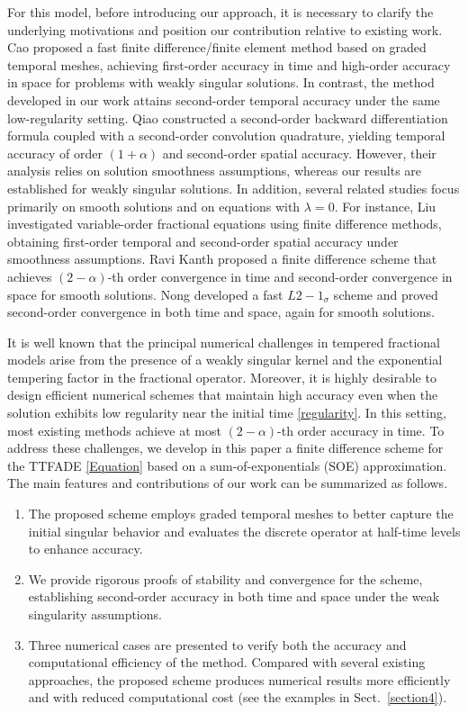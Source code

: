 \documentclass[10pt, reqno]{amsart}
\theoremstyle{remark}
\theoremstyle{definition}
\numberwithin{table}{section}
\begin{document}
For this model, before introducing our approach, it is necessary to clarify the underlying motivations and position our contribution relative to existing work. Cao \cite{cao2020} proposed a fast finite difference/finite element method based on graded temporal meshes, achieving first-order accuracy in time and high-order accuracy in space for problems with weakly singular solutions. In contrast, the method developed in our work attains second-order temporal accuracy under the same low-regularity setting. Qiao \cite{qiao2022} constructed a second-order backward differentiation formula coupled with a second-order convolution quadrature, yielding temporal accuracy of order $(1+\alpha)$ and second-order spatial accuracy. However, their analysis relies on solution smoothness assumptions, whereas our results are established for weakly singular solutions. In addition, several related studies focus primarily on smooth solutions and on equations with $\lambda = 0$. For instance, Liu \cite{Liu2018} investigated variable-order fractional equations using finite difference methods, obtaining first-order temporal and second-order spatial accuracy under smoothness assumptions. Ravi Kanth \cite{RaviKanth2018} proposed a finite difference scheme that achieves $(2-\alpha)$-th order convergence in time and second-order convergence in space for smooth solutions. Nong \cite{nong2024} developed a fast $L2-1_{\sigma}$ scheme and proved second-order convergence in both time and space, again for smooth solutions.

It is well known that the principal numerical challenges in tempered fractional models arise from the presence of a weakly singular kernel and the exponential tempering factor in the fractional operator. Moreover, it is highly desirable to design efficient numerical schemes that maintain high accuracy even when the solution exhibits low regularity near the initial time \eqref{regularity}. In this setting, most existing methods achieve at most $(2-\alpha)$-th order accuracy in time. To address these challenges, we develop in this paper a finite difference scheme for the TTFADE \eqref{Equation} based on a sum-of-exponentials (SOE) approximation. The main features and contributions of our work can be summarized as follows.
\begin{enumerate}[leftmargin=15pt]
    \item The proposed scheme employs graded temporal meshes to better capture the initial singular behavior and evaluates the discrete operator at half-time levels to enhance accuracy.
    \item  We provide rigorous proofs of stability and convergence for the scheme, establishing second-order accuracy in both time and space under the weak singularity assumptions.
    \item Three numerical cases are presented to verify both the accuracy and computational efficiency of the method. Compared with several existing approaches, the proposed scheme produces numerical results more efficiently and with reduced computational cost (see the examples in Sect.~\ref{section4}).
\end{enumerate}
\end{document}

